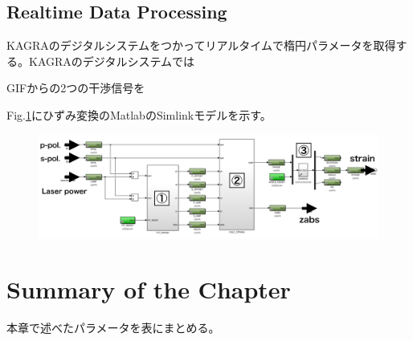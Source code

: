 \subsection{Realtime Data Processing}
KAGRAのデジタルシステムをつかってリアルタイムで楕円パラメータを取得する。KAGRAのデジタルシステムでは

\cite{bork2001overview}


GIFからの2つの干渉信号を

Fig.\ref{img:img420}にひずみ変換のMatlabのSimlinkモデルを示す。

\begin{figure}[h]
  \centering
  \includegraphics[width=15.0cm]{./img_chap4/img420.png}
  \caption{}\label{img:img420}
\end{figure}



\section{Summary of the Chapter} %
本章で述べたパラメータを表にまとめる。
